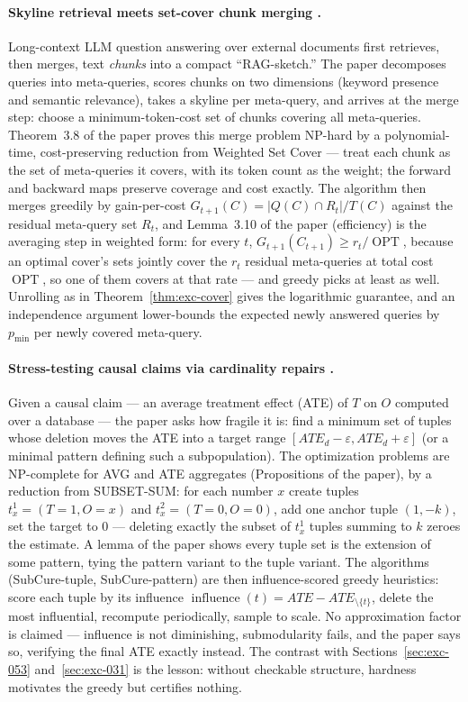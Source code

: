 \paragraph{Skyline retrieval meets set-cover chunk merging \citep{sigmod26-224}.}
Long-context LLM question answering over external documents first retrieves, then
merges, text \emph{chunks} into a compact ``RAG-sketch.'' The paper decomposes queries
into meta-queries, scores chunks on two dimensions (keyword presence and semantic
relevance), takes a skyline per meta-query, and arrives at the merge step: choose a
minimum-token-cost set of chunks covering all meta-queries. Theorem~3.8 of the paper
proves this merge problem NP-hard by a polynomial-time, cost-preserving reduction from
Weighted Set Cover --- treat each chunk as the set of meta-queries it covers, with its
token count as the weight; the forward and backward maps preserve coverage and cost
exactly. The algorithm then merges greedily by gain-per-cost
$G_{t+1}(C) = |Q(C)\cap R_t|/T(C)$ against the residual meta-query set $R_t$, and
Lemma~3.10 of the paper (efficiency) is the averaging step in weighted form: for
every $t$, $G_{t+1}(C_{t+1}) \ge r_t/\operatorname{OPT}$, because an optimal cover's
sets jointly cover the $r_t$ residual meta-queries at total cost
$\operatorname{OPT}$, so one of them covers at that rate --- and greedy picks at least
as well. Unrolling as in Theorem~\ref{thm:exc-cover} gives the logarithmic guarantee,
and an independence argument lower-bounds the expected newly answered queries by
$p_{\min}$ per newly covered meta-query.

\paragraph{Stress-testing causal claims via cardinality repairs \citep{sigmod26-229}.}
Given a causal claim --- an average treatment effect (ATE) of $T$ on $O$ computed over
a database --- the paper asks how fragile it is: find a minimum set of tuples whose
deletion moves the ATE into a target range $[ATE_d-\varepsilon, ATE_d+\varepsilon]$
(or a minimal pattern defining such a subpopulation). The optimization problems are
NP-complete for AVG and ATE aggregates (Propositions of the paper), by a reduction
from SUBSET-SUM: for each number $x$ create tuples $t_x^{1}=(T{=}1,O{=}x)$ and
$t_x^{2}=(T{=}0,O{=}0)$, add one anchor tuple $(1,-k)$, set the target to $0$ ---
deleting exactly the subset of $t_x^{1}$ tuples summing to $k$ zeroes the estimate.
A lemma of the paper shows every tuple set is the extension of some pattern, tying
the pattern variant to the tuple variant. The algorithms (SubCure-tuple,
SubCure-pattern) are then influence-scored greedy heuristics: score each tuple by its
influence $\operatorname{influence}(t) = ATE - ATE_{\setminus\{t\}}$, delete the most
influential, recompute periodically, sample to scale. No approximation factor is
claimed --- influence is not diminishing, submodularity fails, and the paper says so,
verifying the final ATE exactly instead. The contrast with
Sections~\ref{sec:exc-053} and~\ref{sec:exc-031} is the lesson: without checkable
structure, hardness motivates the greedy but certifies nothing.

